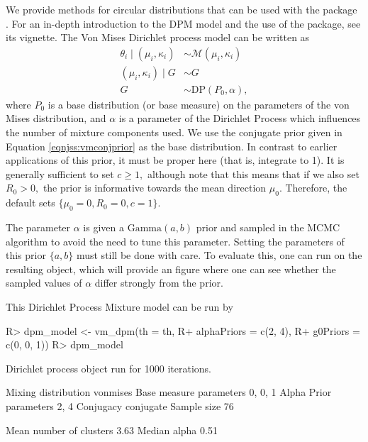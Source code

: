 We provide methods for circular distributions that can be used with the
 package \citep{dirichletprocesspackage}. For an
in-depth introduction to the DPM model and the use of the
 package, see its vignette. The Von Mises
Dirichlet process model can be written as \begin{align}
\theta_i \mid (\mu_i, \kappa_i) &\sim \mathcal{M}(\mu_i, \kappa_i) \\
(\mu_i, \kappa_i) \mid G  &\sim G \\
G &\sim \text{DP}(P_0, \alpha),
\end{align} where \(P_0\) is a base distribution (or base measure) on
the parameters of the von Mises distribution, and \(\alpha\) is a
parameter of the Dirichlet Process which influences the number of
mixture components used. We use the conjugate prior given in Equation
\ref{eqnjss:vmconjprior} as the base distribution. In contrast to
earlier applications of this prior, it must be proper here (that is,
integrate to 1). It is generally sufficient to set \(c \geq 1,\)
although note that this means that if we also set \(R_0 > 0,\) the prior
is informative towards the mean direction \(\mu_0\). Therefore, the
default sets \(\{\mu_0 = 0, R_0 = 0, c = 1\}.\)

The parameter \(\alpha\) is given a \(\text{Gamma}(a, b)\) prior and
sampled in the MCMC algorithm to avoid the need to tune this parameter.
Setting the parameters of this prior \(\{a, b\}\) must still be done
with care. To evaluate this, one can run  on the
resulting object, which will provide an figure where one can see whether
the sampled values of \(\alpha\) differ strongly from the prior.

This Dirichlet Process Mixture model can be run by

\begin{CodeChunk}

\begin{CodeInput}
R> dpm_model <- vm_dpm(th = th, 
R+                     alphaPriors = c(2, 4), 
R+                     g0Priors = c(0, 0, 1))
R> dpm_model
\end{CodeInput}

\begin{CodeOutput}
Dirichlet process object run for 1000 iterations.
                                    
  Mixing distribution       vonmises
  Base measure parameters    0, 0, 1
  Alpha Prior parameters        2, 4
  Conjugacy                conjugate
  Sample size                     76
                                    
  Mean number of clusters       3.63
  Median alpha                  0.51
\end{CodeOutput}
\end{CodeChunk}

